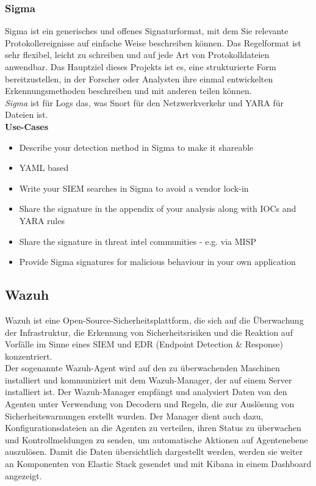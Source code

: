 \subsubsection{Sigma}
Sigma ist ein generisches und offenes Signaturformat, mit dem Sie relevante Protokollereignisse auf einfache Weise beschreiben können. Das Regelformat ist sehr flexibel, leicht zu schreiben und auf jede Art von Protokolldateien anwendbar. Das Hauptziel dieses Projekts ist es, eine strukturierte Form bereitzustellen, in der Forscher oder Analysten ihre einmal entwickelten Erkennungsmethoden beschreiben und mit anderen teilen können.\\
\textit{Sigma} ist für Logs das, was Snort für den Netzwerkverkehr und YARA für Dateien ist.\\
\textbf{Use-Cases}
\begin{itemize}
    \item Describe your detection method in Sigma to make it shareable
    \item YAML based
    \item Write your SIEM searches in Sigma to avoid a vendor lock-in
    \item Share the signature in the appendix of your analysis along with IOCs and YARA rules
    \item Share the signature in threat intel communities - e.g. via MISP
    \item Provide Sigma signatures for malicious behaviour in your own application
\end{itemize}


\subsection{Wazuh}
Wazuh ist eine Open-Source-Sicherheitsplattform, die sich auf die Überwachung der Infrastruktur, die Erkennung von Sicherheitsrisiken und die Reaktion auf Vorfälle im Sinne eines SIEM und EDR (Endpoint Detection \& Response) konzentriert.\\

Der sogenannte Wazuh-Agent wird auf den zu überwachenden Maschinen installiert und kommuniziert mit dem Wazuh-Manager, der auf einem Server installiert ist.
Der Wazuh-Manager empfängt und analysiert Daten von den Agenten unter Verwendung von Decodern und Regeln, die zur Auslösung von Sicherheitswarnungen erstellt wurden.
Der Manager dient auch dazu, Konfigurationsdateien an die Agenten zu verteilen, ihren Status zu überwachen und Kontrollmeldungen zu senden, um automatische Aktionen auf Agentenebene auszulösen.
Damit die Daten übersichtlich dargestellt werden, werden sie weiter an Komponenten von Elastic Stack gesendet und mit Kibana in einem Dashboard angezeigt.

